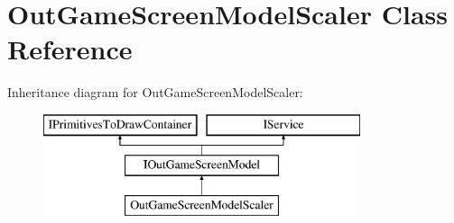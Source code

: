 \hypertarget{classOutGameScreenModelScaler}{}\section{Out\+Game\+Screen\+Model\+Scaler Class Reference}
\label{classOutGameScreenModelScaler}
Inheritance diagram for Out\+Game\+Screen\+Model\+Scaler\+:\begin{figure}[H]
\begin{center}
\leavevmode
\includegraphics[height=3.000000cm]{classOutGameScreenModelScaler}
\end{center}
\end{figure}
